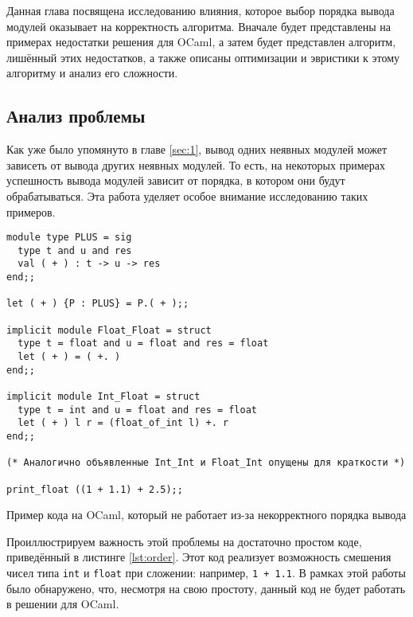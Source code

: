 \documentclass[../diploma.tex]{subfiles}
\begin{document}
\label{sec:3}

Данная глава посвящена исследованию влияния, которое выбор порядка вывода модулей оказывает на корректность алгоритма. Вначале будет представлены на примерах недостатки решения для OCaml, а затем будет представлен алгоритм, лишённый этих недостатков, а также описаны оптимизации и эвристики к этому алгоритму и анализ его сложности.

\subsection{Анализ проблемы}

Как уже было упомянуто в главе \ref{sec:1}, вывод одних неявных модулей может зависеть от вывода других неявных модулей. То есть, на некоторых примерах успешность вывода модулей зависит от порядка, в котором они будут обрабатываться. Эта работа уделяет особое внимание исследованию таких примеров.

\begin{listing}[H]
\begin{verbatim}
module type PLUS = sig
  type t and u and res
  val ( + ) : t -> u -> res
end;;

let ( + ) {P : PLUS} = P.( + );;

implicit module Float_Float = struct
  type t = float and u = float and res = float
  let ( + ) = ( +. )
end;;

implicit module Int_Float = struct
  type t = int and u = float and res = float
  let ( + ) l r = (float_of_int l) +. r
end;;

(* Аналогично объявленные Int_Int и Float_Int опущены для краткости *)

print_float ((1 + 1.1) + 2.5);;
\end{verbatim}
\caption{Пример кода на OCaml, который не работает из-за некорректного порядка вывода}
\label{lst:order}
\end{listing}

Проиллюстрируем важность этой проблемы на достаточно простом коде, приведённый в листинге \ref{lst:order}. Этот код реализует возможность смешения чисел типа \texttt{int} и \texttt{float} при сложении: например, \texttt{1 + 1.1}. В рамках этой работы было обнаружено, что, несмотря на свою простоту, данный код не будет работать в решении для OCaml.
\end{document}
